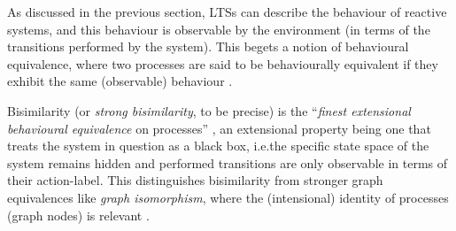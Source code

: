 %
\begin{isabellebody}%
%
%
\isadelimtheory
%
\endisadelimtheory
%
\isatagtheory
%
\endisatagtheory
{\isafoldtheory}%
%
\isadelimtheory
%
\endisadelimtheory
%
\isadelimdocument
%
\endisadelimdocument
%
\isatagdocument
%
\isamarkuptrue%
%
\endisatagdocument
{\isafolddocument}%
%
\isadelimdocument
%
\endisadelimdocument
%
\begin{isamarkuptext}%
\label{sec:strong_bisimilarity}%
\end{isamarkuptext}\isamarkuptrue%
%
\begin{isamarkuptext}%
As discussed in the previous section, LTSs can describe the behaviour of reactive systems, and this behaviour is observable by the environment (in terms of the transitions performed by the system). This begets a notion of behavioural equivalence, where two processes are said to be behaviourally equivalent if they exhibit the same (observable) behaviour \cite{resyst}.

Bisimilarity (or \emph{strong bisimilarity}, to be precise) is the \enquote{\emph{finest extensional behavioural equivalence} \textelp{} on processes} \cite{introBC}, an extensional property being one that treats the system in question as a black box, i.e.\@ the specific state space of the system remains hidden and performed transitions are only observable in terms of their action-label. This distinguishes bisimilarity from stronger graph equivalences like \emph{graph isomorphism}, where the (intensional) identity of processes (graph nodes) is relevant \cite{advBC_origins}.

\end{isamarkuptext}
\end{isabellebody}
